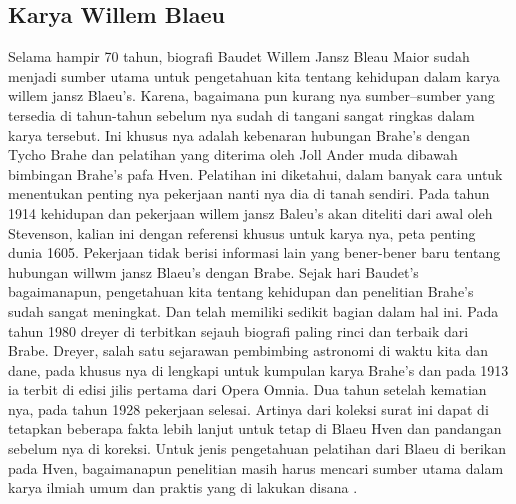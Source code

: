 \subsection{Karya Willem Blaeu}
Selama hampir 70 tahun, biografi Baudet Willem Jansz Bleau Maior sudah menjadi sumber utama untuk pengetahuan kita 
tentang kehidupan dalam karya willem jansz Blaeu's. Karena, bagaimana pun kurang nya sumber–sumber yang tersedia di tahun-tahun 
sebelum nya sudah di tangani sangat ringkas dalam karya tersebut. 
Ini khusus nya adalah kebenaran hubungan Brahe's dengan Tycho Brahe dan pelatihan yang diterima oleh Joll Ander muda dibawah bimbingan Brahe's pafa Hven. 
Pelatihan ini diketahui, dalam banyak cara untuk menentukan penting nya pekerjaan nanti nya dia di tanah sendiri. 
Pada tahun 1914 kehidupan dan pekerjaan willem jansz Baleu's akan diteliti dari awal oleh Stevenson, 
kalian ini dengan referensi khusus untuk karya nya, peta penting dunia 1605. Pekerjaan tidak berisi informasi lain yang bener-bener 
baru tentang hubungan willwm jansz Blaeu's dengan Brabe. Sejak hari Baudet's bagaimanapun, 
pengetahuan kita tentang kehidupan dan penelitian Brahe's sudah sangat meningkat. 
Dan telah memiliki sedikit bagian dalam hal ini. Pada tahun 1980 dreyer di terbitkan sejauh biografi paling rinci dan terbaik dari Brabe.  
Dreyer, salah satu sejarawan pembimbing astronomi di waktu kita dan dane, 
pada khusus nya di lengkapi untuk kumpulan karya Brahe's dan pada 1913 ia terbit di edisi jilis pertama dari Opera Omnia. 
Dua tahun setelah kematian nya, pada tahun 1928 pekerjaan selesai. 
Artinya dari koleksi surat ini dapat di tetapkan beberapa fakta lebih lanjut untuk tetap di Blaeu Hven dan pandangan sebelum nya di koreksi. 
Untuk jenis pengetahuan pelatihan dari Blaeu  di berikan pada Hven,
bagaimanapun penelitian masih harus mencari sumber utama dalam karya ilmiah umum dan praktis yang di lakukan disana \cite{richter1939willem}.


